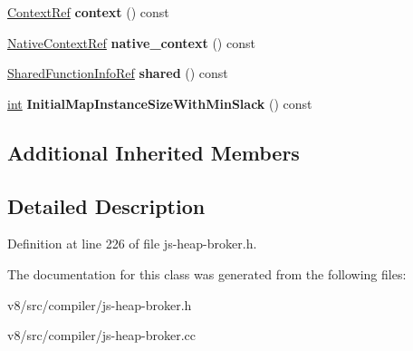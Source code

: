 \begin{DoxyCompactItemize}
\item 
\mbox{\label{classv8_1_1internal_1_1compiler_1_1JSFunctionRef_a88a83c2fd9feec7ee86f92497d15c27d}} 
\mbox{\hyperlink{classv8_1_1internal_1_1compiler_1_1ContextRef}{Context\+Ref}} {\bfseries context} () const
\item 
\mbox{\label{classv8_1_1internal_1_1compiler_1_1JSFunctionRef_aadad4ab483a4b44e3103ae77df28b4b5}} 
\mbox{\hyperlink{classv8_1_1internal_1_1compiler_1_1NativeContextRef}{Native\+Context\+Ref}} {\bfseries native\+\_\+context} () const
\item 
\mbox{\label{classv8_1_1internal_1_1compiler_1_1JSFunctionRef_aba4b3029d8e3a845fcafdafcf4099015}} 
\mbox{\hyperlink{classv8_1_1internal_1_1compiler_1_1SharedFunctionInfoRef}{Shared\+Function\+Info\+Ref}} {\bfseries shared} () const
\item 
\mbox{\label{classv8_1_1internal_1_1compiler_1_1JSFunctionRef_abbc97c5800cdafcba40f74786a7f357c}} 
\mbox{\hyperlink{classint}{int}} {\bfseries Initial\+Map\+Instance\+Size\+With\+Min\+Slack} () const
\end{DoxyCompactItemize}
\subsection*{Additional Inherited Members}


\subsection{Detailed Description}


Definition at line 226 of file js-\/heap-\/broker.\+h.



The documentation for this class was generated from the following files\+:\begin{DoxyCompactItemize}
\item 
v8/src/compiler/js-\/heap-\/broker.\+h\item 
v8/src/compiler/js-\/heap-\/broker.\+cc\end{DoxyCompactItemize}
